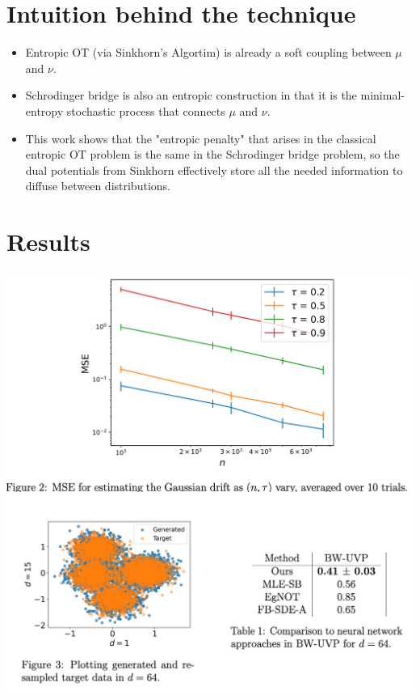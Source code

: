 \documentclass{article}
\begin{document}
\section{Intuition behind the technique}
\begin{itemize}
    \item Entropic OT (via Sinkhorn's Algortim) is already a soft coupling between $\mu$ and $\nu$. 
    \item Schrodinger bridge is also an entropic construction in that it is the minimal-entropy stochastic process that connects $\mu$ and $\nu$.
    \item This work shows that the "entropic penalty" that arises in the classical entropic OT problem is the same in the Schrodinger bridge problem, so the dual potentials from Sinkhorn effectively store all the needed information to diffuse between distributions.
\end{itemize}
\section{Results}
\includegraphics[width=\textwidth, height=0.4\textheight]{Smooth Schrodinger Bridges/Drift.png}
\includegraphics[width=\textwidth, height=0.4\textheight]{Smooth Schrodinger Bridges/SynthData.png}
\end{document}
